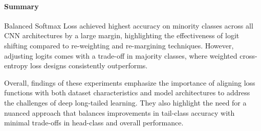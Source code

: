 \paragraph{Summary}
Balanced Softmax Loss achieved highest accuracy on minority classes across all CNN architectures by a large margin, highlighting the effectiveness of logit shifting compared to re-weighting and re-margining techniques. However, adjusting logits comes with a trade-off in majority classes, where weighted cross-entropy loss designs consistently outperforms.

Overall, findings of these experiments emphasize the importance of aligning loss functions with both dataset characteristics and model architectures to address the challenges of deep long-tailed learning. They also highlight the need for a nuanced approach that balances improvements in tail-class accuracy with minimal trade-offs in head-class and overall performance.




